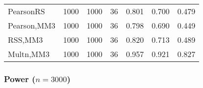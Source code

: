 \documentclass[
]{article}
\begin{document}
\begin{table}[H]
{\begin{tabular}[t]{lrrrrrr}
\hspace{1em}PearsonRS & 1000 & 1000 & 36 & 0.801 & 0.700 & 0.479\\
\hspace{1em}Pearson,MM3 & 1000 & 1000 & 36 & 0.798 & 0.690 & 0.449\\
\hspace{1em}RSS,MM3 & 1000 & 1000 & 36 & 0.820 & 0.713 & 0.489\\
\hspace{1em}Multn,MM3 & 1000 & 1000 & 36 & 0.957 & 0.921 & 0.827\\
\bottomrule
\end{tabular}}
\end{table}

\hypertarget{power-n3000-1}{%
\subsubsection{\texorpdfstring{Power
(\(n=3000\))}{Power (n=3000)}}\label{power-n3000-1}}
\end{document}
